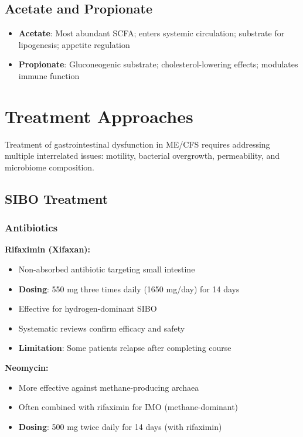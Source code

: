 \subsection{Acetate and Propionate}

\begin{itemize}
    \item \textbf{Acetate}: Most abundant SCFA; enters systemic circulation; substrate for lipogenesis; appetite regulation
    \item \textbf{Propionate}: Gluconeogenic substrate; cholesterol-lowering effects; modulates immune function
\end{itemize}

\section{Treatment Approaches}
\label{sec:gi-treatment}

Treatment of gastrointestinal dysfunction in ME/CFS requires addressing multiple interrelated issues: motility, bacterial overgrowth, permeability, and microbiome composition.

\subsection{SIBO Treatment}

\subsubsection{Antibiotics}

\textbf{Rifaximin (Xifaxan):}
\begin{itemize}
    \item Non-absorbed antibiotic targeting small intestine
    \item \textbf{Dosing}: 550 mg three times daily (1650 mg/day) for 14 days
    \item Effective for hydrogen-dominant SIBO
    \item Systematic reviews confirm efficacy and safety
    \item \textbf{Limitation}: Some patients relapse after completing course
\end{itemize}

\textbf{Neomycin:}
\begin{itemize}
    \item More effective against methane-producing archaea
    \item Often combined with rifaximin for IMO (methane-dominant)
    \item \textbf{Dosing}: 500 mg twice daily for 14 days (with rifaximin)
\end{itemize}

